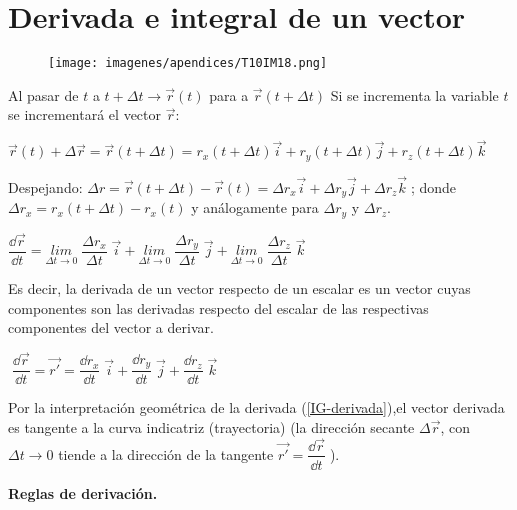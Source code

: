 \section{Derivada e integral de un vector}

\begin{multicols}{2}
	\begin{figure}[H]
	\centering
	\texttt{[image: imagenes/apendices/T10IM18.png]}
	\end{figure}
Al pasar de $t$ a $t+ \Delta t \to \vec r (t)$ para a $\vec r (t+\Delta t)$ Si se incrementa la variable $t$ se incrementará el vector $\vec r$:

$\vec r (t) + \Delta \vec r = \vec r (t+\Delta t) = r_x (t+\Delta t) \vec i + r_y (t+\Delta t) \vec j + r_z (t+\Delta t) \vec k$

Despejando: $\Delta r =\vec r (t+\Delta t) - \vec r (t) = \Delta r_x \vec i +\Delta r_y \vec j +\Delta r_z \vec k \; $;  donde $\Delta r_x =  r_x (t+\Delta t) -  r_x (t) $ y análogamente para $\Delta r_y$ y $\Delta r_z$.
\end{multicols}

$\dfrac {\dd \vec r}{\dd t }= \underset{\Delta t \to 0}{lim}\; {\dfrac {\Delta r_x}{\Delta t}\;  \vec i} + \underset{\Delta t \to 0}{lim}\; {\dfrac {\Delta r_y}{\Delta t}\;  \vec j} + \underset{\Delta t \to 0}{lim}\; {\dfrac {\Delta r_z}{\Delta t}\;  \vec k}$

Es decir, la derivada de un vector respecto de un escalar es un vector cuyas componentes son las derivadas respecto del escalar de las respectivas componentes del vector a derivar.

\hspace{30mm}$\boxed{ \; \dfrac {\dd \vec r}{\dd t }= \overrightarrow {r'} = \dfrac {\dd r_x}{\dd t}\; \vec i + \dfrac {\dd r_y}{\dd t}\; \vec j + \dfrac {\dd r_z}{\dd t}\; \vec k\; }$

Por la interpretación geométrica de la derivada (\ref{IG-derivada}),el vector derivada es tangente a la curva indicatriz (trayectoria) (la dirección secante $\Delta \vec r$, con $\Delta t \to 0$ tiende a la dirección de la tangente $  \overrightarrow { r'} =\dfrac {\dd \vec r}{\dd t }\;$).

\vspace{4mm} \textbf {Reglas de derivación.} 

